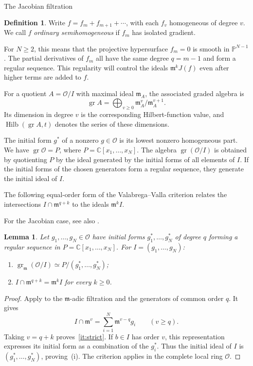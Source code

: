 \documentclass[12pt,reqno]{amsart}
\makeatletter
\renewcommand\subsection{\@startsection{subsection}{2}%
  \z@{.8\linespacing\@plus.3\linespacing}{.35\linespacing}%
  {\normalfont\bfseries}}
\newcommand{\C}{\mathbb C}
\newcommand{\mm}{\mathfrak m}
\newcommand{\gr}{\operatorname{gr}}
\newcommand{\Hilb}{\operatorname{Hilb}}
\newcommand{\OO}{\mathcal O}
\newtheorem{lemma}[theorem]{Lemma}
\theoremstyle{definition}
\newtheorem{definition}[theorem]{Definition}
\makeatother
\begin{document}
 


 


\subsection{The Jacobian filtration}
\begin{definition}
Write $f=f_m+f_{m+1}+\cdots$, with each $f_v$ homogeneous of degree
$v$. We call $f$ \emph{ordinary semihomogeneous} if $f_m$ has
isolated gradient.
\end{definition}
For $N\geq2$, this means that the projective hypersurface $f_m=0$
is smooth in $\mathbb P^{N-1}$. The partial derivatives of $f_m$
all have the same degree
$q=m-1$ and form a regular sequence. This regularity will control
the ideals $\mm^kJ(f)$ even after higher terms are added to $f$.

For a quotient $A=\OO/I$ with maximal ideal $\mm_A$, the associated
graded algebra is
\[
 \gr A=\bigoplus_{v\geq0}\mm_A^v/\mm_A^{v+1}.
\]
Its dimension in degree $v$ is the corresponding Hilbert-function
value, and $\Hilb(\gr A,t)$ denotes the series of these dimensions.

The initial form $g^*$ of a nonzero $g\in \OO$ is its lowest nonzero
homogeneous part. We have $\gr \OO=P$, where
$P=\C[x_1,\ldots,x_N]$. The algebra $\gr(\OO/I)$ is obtained by
quotienting $P$ by the ideal generated by the initial forms of all
elements of $I$.
If the initial forms of the chosen generators form a regular
sequence, they generate the initial ideal of $I$.


 
The following equal-order form of the Valabrega--Valla criterion
\cite[Corollary~2.7]{ValabregaValla} relates the intersections
$I\cap\mm^{q+k}$ to the ideals $\mm^kI$.

For the Jacobian case, see also
\cite[Proposition~3.1]{LiuYauZhang2026}.


\begin{lemma}\label{lem:strict}
Let $g_1,\ldots,g_N\in \OO$ have initial forms $g_1^*,\ldots,g_N^*$
of degree $q$ forming a regular sequence in
$P=\C[x_1,\ldots,x_N]$. For $I=(g_1,\ldots,g_N)$:
\begin{enumerate}
\item $\gr_{\mm}(\OO/I)\simeq P/(g_1^*,\ldots,g_N^*)$;
\item \label{it:strict} $I\cap\mm^{q+k}=\mm^kI$ for every $k\geq0$.
\end{enumerate}
\end{lemma}
\begin{proof}
Apply \cite[Corollary~2.7]{ValabregaValla} to the $\mm$-adic
filtration and the generators of common order $q$. It gives
\[
 I\cap\mm^v=\sum_{i=1}^N\mm^{v-q}g_i\qquad(v\geq q).
\]
Taking $v=q+k$ proves~\ref{it:strict}. If $b\in I$ has order $v$,
this representation expresses its initial form as a combination
of the $g_i^*$. Thus the initial ideal of $I$ is
$(g_1^*,\ldots,g_N^*)$, proving~(i).
The criterion applies in the complete local ring $\OO$.
\end{proof}
\end{document}
